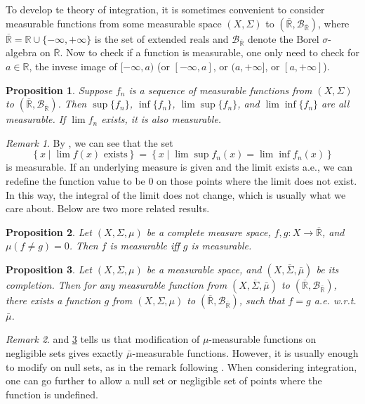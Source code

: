 \documentclass[openany]{book}
\newtheorem{proposition}{Proposition}[chapter]
\theoremstyle{definition}
\theoremstyle{remark}
\newtheorem*{remark}{Remark}
\begin{document}
To develop te theory of integration, it is sometimes convenient to consider measurable functions from some measurable space $(X,\Sigma)$ to $(\overline{\mathbb{R}},\mathcal{B}_{\overline{\mathbb{R}}})$, where $\overline{\mathbb{R}}=\mathbb{R}\cup\{-\infty,+\infty\}$ is the set of extended reals and $\mathcal{B}_{\overline{\mathbb{R}}}$ denote the Borel $\sigma$-algebra on $\overline{\mathbb{R}}$. Now to check if a function is measurable, one only need to check for $a\in \mathbb{R}$, the invese image of $[-\infty,a)$ (or $[-\infty,a]$, or $(a,+\infty]$, or $[a,+\infty]$).
\begin{proposition}\label{prop:limMeasurable}
    Suppose $f_n$ is a sequence of measurable functions from $(X,\Sigma)$ to $(\overline{\mathbb{R}},\mathcal{B}_{\overline{\mathbb{R}}})$. Then $\sup\{f_n\}$, $\inf\{f_n\}$, $\lim\sup\{f_n\}$, and $\lim\inf\{f_n\}$ are all measurable. If $\lim f_n$ exists, it is also measurable.
\end{proposition}
\begin{remark}
    By , we can see that the set
    \begin{equation*}
        \left\{x\middle|\lim f(x)\textrm{ exists}\right\}=\left\{x\middle|\lim\sup f_n(x)=\lim\inf f_n(x)\right\}
    \end{equation*}
    is measurable. If an underlying measure is given and the limit exists a.e., we can redefine the function value to be $0$ on those points where the limit does not exist. In this way, the integral of the limit does not change, which is usually what we care about. Below are two more related results.
\end{remark}
\begin{proposition}\label{prop:nullDiff}
    Let $(X,\Sigma,\mu)$ be a complete measure space, $f,g:X\to\overline{\mathbb{R}}$, and $\mu(f\ne g)=0$. Then $f$ is measurable iff $g$ is measurable.
\end{proposition}
\begin{proposition}\label{prop:negligibleDiff}
    Let $(X,\Sigma,\mu)$ be a measurable space, and $(X,\overline{\Sigma},\bar{\mu})$ be its completion. Then for any measurable function from $(X,\overline{\Sigma},\bar{\mu})$ to $(\overline{\mathbb{R}},\mathcal{B}_{\overline{\mathbb{R}}})$, there exists a function $g$ from $(X,\Sigma,\mu)$ to $(\overline{\mathbb{R}},\mathcal{B}_{\overline{\mathbb{R}}})$, such that $f=g$ a.e. w.r.t. $\bar{\mu}$.
\end{proposition}
\begin{remark}
     and \ref{prop:negligibleDiff} tells us that modification of $\mu$-measurable functions on negligible sets gives exactly $\bar{\mu}$-measurable functions. However, it is usually enough to modify on null sets, as in the remark following . When considering integration, one can go further to allow a null set or negligible set of points where the function is undefined.
\end{remark}
\end{document}
